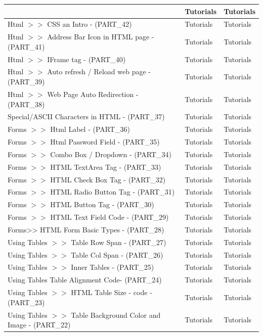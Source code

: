 \documentclass[a4paper, 11pt]{article}
\begin{document}
\begin{longtable}{ |p{10cm}|p{2cm}|p{2cm}| }
&
Tutorials
&
Tutorials \\
\hline
Html  $>>$ CSS an Intro - (PART\_42)
&
Tutorials
&
Tutorials \\
\hline
Html  $>>$ Address Bar Icon in HTML page - (PART\_41)
&
Tutorials
&
Tutorials \\
\hline
Html $>>$ IFrame  tag - (PART\_40)
&
Tutorials
&
Tutorials \\
\hline
Html  $>>$ Auto refresh / Reload web page - (PART\_39)
&
Tutorials
&
Tutorials \\
\hline
Html  $>>$ Web Page Auto Redirection - (PART\_38)
&
Tutorials
&
Tutorials \\
\hline
Special/ASCII Characters in HTML - (PART\_37)
&
Tutorials
&
Tutorials \\
\hline
Forms $>>$  Html Label  - (PART\_36)
&
Tutorials
&
Tutorials \\
\hline
Forms $>>$ Html Password Field - (PART\_35)
&
Tutorials
&
Tutorials \\
\hline
Forms $>>$ Combo Box / Dropdown  - (PART\_34)
&
Tutorials
&
Tutorials \\
\hline
Forms $>>$ HTML TextArea Tag  - (PART\_33)
&
Tutorials
&
Tutorials \\
\hline
Forms $>>$ HTML Check Box Tag  - (PART\_32)
&
Tutorials
&
Tutorials \\
\hline
Forms $>>$ HTML Radio Button Tag  - (PART\_31)
&
Tutorials
&
Tutorials \\
\hline
Forms $>>$ HTML Button Tag - (PART\_30)
&
Tutorials
&
Tutorials \\
\hline
Forms $>>$ HTML Text Field Code - (PART\_29)
&
Tutorials
&
Tutorials \\
\hline
Forms>>  HTML Form Basic Types  - (PART\_28)
&
Tutorials
&
Tutorials \\
\hline
Using Tables $>>$ Table Row Span  - (PART\_27)
&
Tutorials
&
Tutorials \\
\hline
Using Tables $>>$ Table Col Span - (PART\_26)
&
Tutorials
&
Tutorials \\
\hline
Using Tables $>>$ Inner Tables - (PART\_25)
&
Tutorials
&
Tutorials \\
\hline
Using Tables    Table Alignment Code- (PART\_24)
&
Tutorials
&
Tutorials \\
\hline
Using Tables  $>>$ HTML Table Size - code  - (PART\_23)
&
Tutorials
&
Tutorials \\
\hline
Using Tables $>>$ Table Background Color and Image - (PART\_22)
&
Tutorials
&
Tutorials \\
\hline

\end{longtable}
\end{document}
